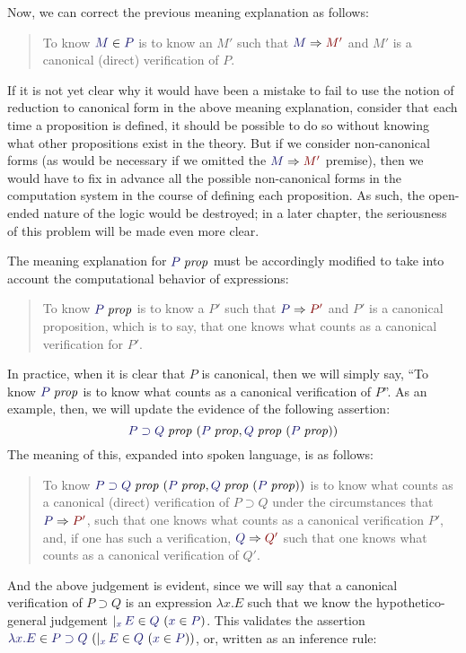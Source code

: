 \documentclass[main.tex]{subfiles}
\begin{document}
Now, we can correct the previous meaning explanation as follows:

\begin{quote}
  To know $\ver{M}{P}$ is to know an $M'$ such that $\reduce{M}{M'}$ and $M'$ is a
  canonical (direct) verification of $P$.
\end{quote}

If it is not yet clear why it would have been a mistake to fail to use
the notion of reduction to canonical form in the above meaning
explanation, consider that each time a proposition is defined, it
should be possible to do so without knowing what other propositions
exist in the theory. But if we consider non-canonical forms (as would
be necessary if we omitted the $\reduce{M}{M'}$ premise), then we
would have to fix in advance all the possible non-canonical forms in
the computation system in the course of defining each proposition. As
such, the open-ended nature of the logic would be destroyed; in a
later chapter, the seriousness of this problem will be made even more
clear.


The meaning explanation for $\isprop{P}$ must be accordingly modified to take
into account the computational behavior of expressions:

\begin{quote}
  To know $\isprop{P}$ is to know a $P'$ such that $\reduce{P}{P'}$ and $P'$ is a
  canonical proposition, which is to say, that one knows what counts as a
  canonical verification for $P'$.
\end{quote}

In practice, when it is clear that $P$ is canonical, then we will simply say,
``To know $\isprop{P}$ is to know what counts as a canonical verification of
$P$''. As an example, then, we will update the evidence of the following assertion:
\[\hyp{\isprop{P\supset Q}}{\isprop{P},\hyp{\isprop{Q}}{\isprop{P}}}
\]
The meaning
of this, expanded into spoken language, is as follows:
\begin{quote}
  To know $\hyp{\isprop{P\supset
Q}}{\isprop{P},\hyp{\isprop{Q}}{\isprop{P}}}$ is to know what counts
  as a canonical (direct) verification of $P\supset Q$ under the
  circumstances that $\reduce{P}{P'}$, such that one knows what counts
  as a canonical verification $P'$, and, if one has such a verification,
  $\reduce{Q}{Q'}$ such that one knows what counts as a canonical
  verification of $Q'$.
\end{quote}

And the above judgement is evident, since we will say that a canonical
verification of $P\supset Q$ is an expression $\lambda x. E$ such that
we know the hypothetico-general judgement
$\genj{x}{\hyp{\ver{E}{Q}}{\ver{x}{P}}}$. This validates the assertion
$\hyp{\ver{\lambda x.E}{P\supset
Q}}{\genj{x}{\hyp{\ver{E}{Q}}{\ver{x}{P}}}}$, or, written as an
inference rule:
\end{document}
